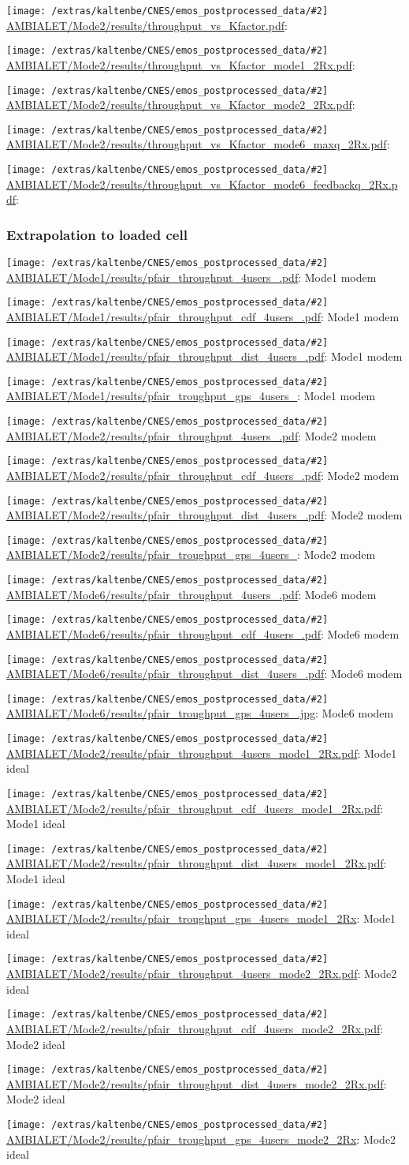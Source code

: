 \documentclass[a4paper,10pt]{article}
\newcommand{\printfile}[2][]{
 \begin{minipage}{8cm}
  \centering
  \texttt{[image: /extras/kaltenbe/CNES/emos\_postprocessed\_data/\#2]}
  \url{#2}: #1

 \end{minipage}
}
\begin{document}
\printfile{AMBIALET/Mode2/results/throughput_vs_Kfactor.pdf}

\printfile{AMBIALET/Mode2/results/throughput_vs_Kfactor_mode1_2Rx.pdf}
\printfile{AMBIALET/Mode2/results/throughput_vs_Kfactor_mode2_2Rx.pdf}

\printfile{AMBIALET/Mode2/results/throughput_vs_Kfactor_mode6_maxq_2Rx.pdf}
\printfile{AMBIALET/Mode2/results/throughput_vs_Kfactor_mode6_feedbackq_2Rx.pdf}


\subsubsection{Extrapolation to loaded cell}

\printfile[Mode1 modem]{AMBIALET/Mode1/results/pfair_throughput_4users_.pdf}
\printfile[Mode1 modem]{AMBIALET/Mode1/results/pfair_throughput_cdf_4users_.pdf}

\printfile[Mode1 modem]{AMBIALET/Mode1/results/pfair_throughput_dist_4users_.pdf}
\printfile[Mode1 modem]{AMBIALET/Mode1/results/pfair_troughput_gps_4users_}

\printfile[Mode2 modem]{AMBIALET/Mode2/results/pfair_throughput_4users_.pdf}
\printfile[Mode2 modem]{AMBIALET/Mode2/results/pfair_throughput_cdf_4users_.pdf}

\printfile[Mode2 modem]{AMBIALET/Mode2/results/pfair_throughput_dist_4users_.pdf}
\printfile[Mode2 modem]{AMBIALET/Mode2/results/pfair_troughput_gps_4users_}

\printfile[Mode6 modem]{AMBIALET/Mode6/results/pfair_throughput_4users_.pdf}
\printfile[Mode6 modem]{AMBIALET/Mode6/results/pfair_throughput_cdf_4users_.pdf}

\printfile[Mode6 modem]{AMBIALET/Mode6/results/pfair_throughput_dist_4users_.pdf}
\printfile[Mode6 modem]{AMBIALET/Mode6/results/pfair_troughput_gps_4users_.jpg}

\printfile[Mode1 ideal]{AMBIALET/Mode2/results/pfair_throughput_4users_mode1_2Rx.pdf}
\printfile[Mode1 ideal]{AMBIALET/Mode2/results/pfair_throughput_cdf_4users_mode1_2Rx.pdf}

\printfile[Mode1 ideal]{AMBIALET/Mode2/results/pfair_throughput_dist_4users_mode1_2Rx.pdf}
\printfile[Mode1 ideal]{AMBIALET/Mode2/results/pfair_troughput_gps_4users_mode1_2Rx}

\printfile[Mode2 ideal]{AMBIALET/Mode2/results/pfair_throughput_4users_mode2_2Rx.pdf}
\printfile[Mode2 ideal]{AMBIALET/Mode2/results/pfair_throughput_cdf_4users_mode2_2Rx.pdf}

\printfile[Mode2 ideal]{AMBIALET/Mode2/results/pfair_throughput_dist_4users_mode2_2Rx.pdf}
\printfile[Mode2 ideal]{AMBIALET/Mode2/results/pfair_troughput_gps_4users_mode2_2Rx}
\end{document}
